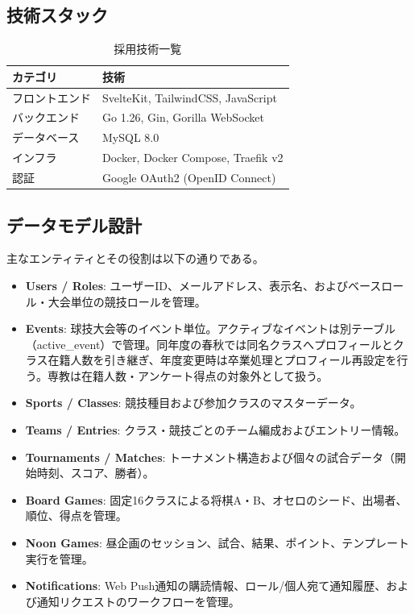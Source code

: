 \documentclass[paper=a4, fontsize=11pt]{jlreq}
\begin{document}
\subsection{技術スタック}
\begin{table}[H]
    \centering
    \caption{採用技術一覧}
    \begin{tabularx}{\textwidth}{l l}
        \toprule
        カテゴリ & 技術 \\
        \midrule
        フロントエンド & SvelteKit, TailwindCSS, JavaScript \\
        バックエンド & Go 1.26, Gin, Gorilla WebSocket \\
        データベース & MySQL 8.0 \\
        インフラ & Docker, Docker Compose, Traefik v2 \\
        認証 & Google OAuth2 (OpenID Connect) \\
        \bottomrule
    \end{tabularx}
\end{table}

\subsection{データモデル設計}
主なエンティティとその役割は以下の通りである。

\begin{itemize}
    \item \textbf{Users / Roles}: ユーザーID、メールアドレス、表示名、およびベースロール・大会単位の競技ロールを管理。
    \item \textbf{Events}: 球技大会等のイベント単位。アクティブなイベントは別テーブル（active\_event）で管理。同年度の春秋では同名クラスへプロフィールとクラス在籍人数を引き継ぎ、年度変更時は卒業処理とプロフィール再設定を行う。専教は在籍人数・アンケート得点の対象外として扱う。
    \item \textbf{Sports / Classes}: 競技種目および参加クラスのマスターデータ。
    \item \textbf{Teams / Entries}: クラス・競技ごとのチーム編成およびエントリー情報。
    \item \textbf{Tournaments / Matches}: トーナメント構造および個々の試合データ（開始時刻、スコア、勝者）。
    \item \textbf{Board Games}: 固定16クラスによる将棋A・B、オセロのシード、出場者、順位、得点を管理。
    \item \textbf{Noon Games}: 昼企画のセッション、試合、結果、ポイント、テンプレート実行を管理。
    \item \textbf{Notifications}: Web Push通知の購読情報、ロール/個人宛て通知履歴、および通知リクエストのワークフローを管理。
\end{itemize}
\end{document}
